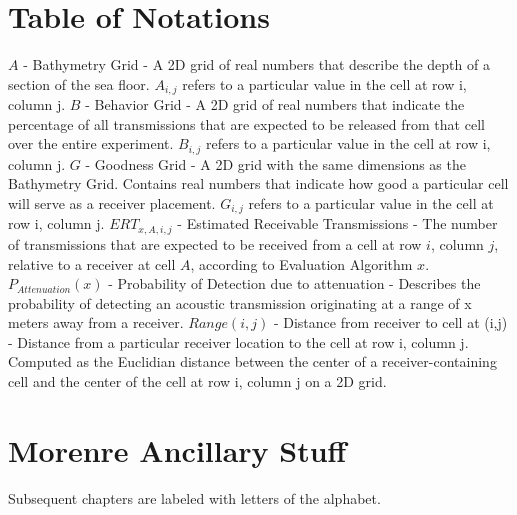 
\chapter{Table of Notations}
$A$ - Bathymetry Grid - A 2D grid of real numbers that describe the depth of a section of the sea floor.  $A_{i,j}$ refers to a particular value in the cell at row i, column j.
\newline
\newline
$B$ - Behavior Grid - A 2D grid of real numbers that indicate the percentage of all transmissions that are expected to be released from that cell over the entire experiment.  $B_{i,j}$ refers to a particular value in the cell at row i, column j.
\newline
\newline
$G$ - Goodness Grid - A 2D grid with the same dimensions as the Bathymetry Grid.  Contains real numbers that indicate how good a particular cell will serve as a receiver placement.  $G_{i,j}$ refers to a particular value in the cell at row i, column j.
\newline
\newline
$ERT_{x,A,i,j}$ - Estimated Receivable Transmissions - The number of transmissions that are expected to be received from a cell at row $i$, column $j$, relative to a receiver at cell $A$, according to Evaluation Algorithm $x$.
\newline
\newline
$P_{Attenuation}(x)$ - Probability of Detection due to attenuation - Describes the probability of detecting an acoustic transmission originating at a range of x meters away from a receiver.
\newline
\newline
$Range(i,j)$ - Distance from receiver to cell at (i,j) - Distance from a particular receiver location to the cell at row i, column j.  Computed as the Euclidian distance between the center of a receiver-containing cell and the center of the cell at row i, column j on a 2D grid.

\chapter{Morenre Ancillary Stuff}

Subsequent chapters are labeled with letters of the alphabet.
